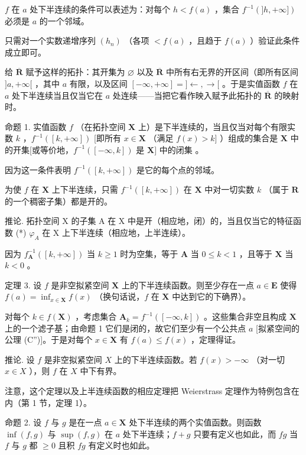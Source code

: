 \(f\) 在 \(a\) 处下半连续的条件可以表述为：对每个 \(h < f(a)\) ，集合 \(f^{-1}(]h, +\infty])\) 必须是 \(a\) 的一个邻域。

只需对一个实数递增序列 \((h_{n})\) （各项 \(<f(a)\) ，且趋于 \(f(a)\) ）验证此条件成立即可。

给 \(\overline{\mathbf{R}}\) 赋予这样的拓扑：其开集为 \(\varnothing\) 以及 \(\overline{\mathbf{R}}\) 中所有右无界的开区间（即所有区间 \(]a, +\infty[\) ，其中 \(a\) 有限，以及区间 \([- \infty, +\infty] = ] \leftarrow, \rightarrow[\) 。于是实值函数 \(f\) 在 \(a\) 处下半连续当且仅当它在 \(a\) 处连续——当把它看作映入赋予此拓扑的 \(\overline{\mathbf{R}}\) 的映射时。

命题 1. 实值函数 \(f\) （在拓扑空间 \(\mathbf{X}\) 上）是下半连续的，当且仅当对每个有限实数 \(k\) ，\(f^{-1}([k, +\infty])\) {[}即所有 \(x \in \mathbf{X}\) （满足 \(f(x) > k]\) ）组成的集合是 \(\mathbf{X}\) 中的开集{[}或等价地，\(f^{-1}([- \infty, k])\) 是 \(\mathbf{X}]\) 中的闭集 。

因为这一条件表明 \(f^{-1}([k, +\infty])\) 是它的每个点的邻域。

为使 \(f\) 在 \(\mathbf{X}\) 上下半连续，只需 \(f^{-1}([k, +\infty])\) 在 \(\mathbf{X}\) 中对一切实数 \(k\) （属于 \(\mathbf{R}\) 的一个稠密子集）都是开的。

推论. 拓扑空间 X 的子集 A 在 X 中是开（相应地，闭）的，当且仅当它的特征函数 (*) \(\varphi_{A}\) 在 X 上下半连续（相应地，上半连续）。

因为 \(f_{\mathbf{A}}^{-1}([k, +\infty])\) 当 \(k \geqslant 1\) 时为空集，等于 \(\mathbf{A}\) 当 \(0 \leqslant k < 1\) ，且等于 \(\mathbf{X}\) 当 \(k < 0\) 。

定理 3. 设 \(f\) 是非空拟紧空间 \(\mathbf{X}\) 上的下半连续函数。则至少存在一点 \(a \in \mathbf{E}\) 使得 \(f(a) = \inf_{x \in \mathbf{X}} f(x)\) （换句话说，\(f\) 在 \(\mathbf{X}\) 中达到它的下确界）。

对每个 \(k \in f(\mathbf{X})\) ，考虑集合 \(\mathbf{A}_k = f^{-1}([-\infty, k])\) 。这些集合非空且构成 \(\mathbf{X}\) 上的一个滤子基；由命题 1 它们是闭的，故它们至少有一个公共点 \(a\) {[}拟紧空间的公理 (C''){]}。于是对每个 \(x \in \mathbf{X}\) 有 \(f(a) \leqslant f(x)\) ，定理得证。

推论. 设 \(f\) 是非空拟紧空间 \(X\) 上的下半连续函数。若 \(f(x) > -\infty\) （对一切 \(x \in X\) ），则 \(f\) 在 \(X\) 中下有界。

注意，这个定理以及上半连续函数的相应定理把 Weierstrass 定理作为特例包含在内（第 1 节，定理 1）。

命题 2. 设 \(f\) 与 \(g\) 是在一点 \(a \in \mathbf{X}\) 处下半连续的两个实值函数。则函数 \(\inf(f, g)\) 与 \(\sup(f, g)\) 在 \(a\) 处下半连续；\(f + g\) 只要有定义也如此，而 \(fg\) 当 \(f\) 与 \(g\) 都 \(\geqslant 0\) 且积 \(fg\) 有定义时也如此。

